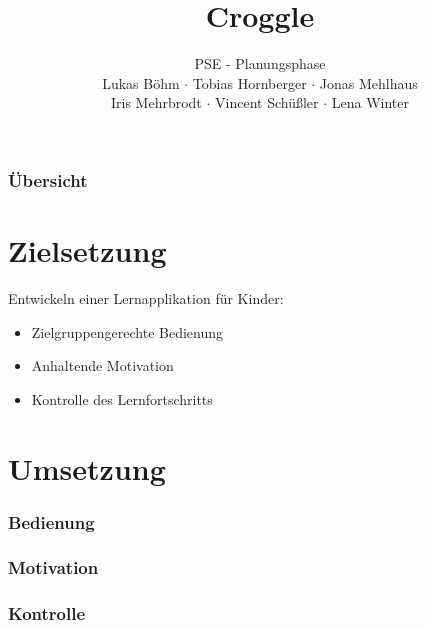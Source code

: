 \documentclass[t]{beamer}
\title{Croggle}
\subtitle{PSE - Planungsphase \\[0.3cm]
Lukas Böhm $\cdot$ Tobias Hornberger $\cdot$ Jonas Mehlhaus \\ Iris Mehrbrodt  $\cdot$ Vincent Schüßler $\cdot$ Lena Winter}
\institute[IPD]{Institut für Programmstruktutren und Datenorganisation}
\begin{document}
\begin{frame}
        \maketitle
\end{frame}

\begin{frame}
        \frametitle{Übersicht}
        \tableofcontents
\end{frame}

\section{Zielsetzung}
\begin{frame}
	Entwickeln einer Lernapplikation für Kinder:\\
	\begin{itemize}
		\item Zielgruppengerechte Bedienung \pause
		\item Anhaltende Motivation \pause
		\item Kontrolle des Lernfortschritts
	\end{itemize}
\end{frame}

\section{Umsetzung}
\begin{frame}
 \frametitle{Bedienung}
\end{frame}
\begin{frame}
 \frametitle{Motivation}
\end{frame}
\begin{frame}
 \frametitle{Kontrolle}
\end{frame}
\end{document}
